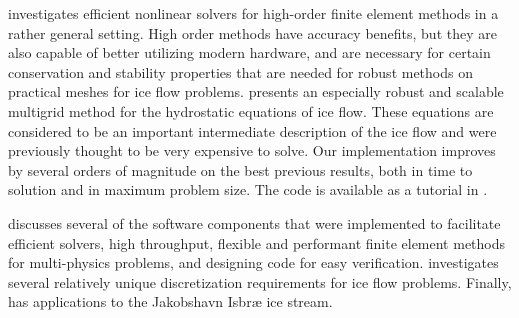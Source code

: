  investigates efficient nonlinear solvers for high-order finite element methods in a rather general setting.
High order methods have accuracy benefits, but they are also capable of better utilizing modern hardware, and are necessary for certain conservation and stability properties that are needed for robust methods on practical meshes for ice flow problems.
 presents an especially robust and scalable multigrid method for the hydrostatic equations of ice flow.
These equations are considered to be an important intermediate description of the ice flow and were previously thought to be very expensive to solve.
Our implementation improves by several orders of magnitude on the best previous results, both in time to solution and in maximum problem size.
The code is available as a tutorial in {\PETSc}.

 discusses several of the software components that were implemented to facilitate efficient solvers, high throughput, flexible and performant finite element methods for multi-physics problems, and designing code for easy verification.
 investigates several relatively unique discretization requirements for ice flow problems.
Finally,  has applications to the Jakobshavn Isbr{\ae} ice stream.
